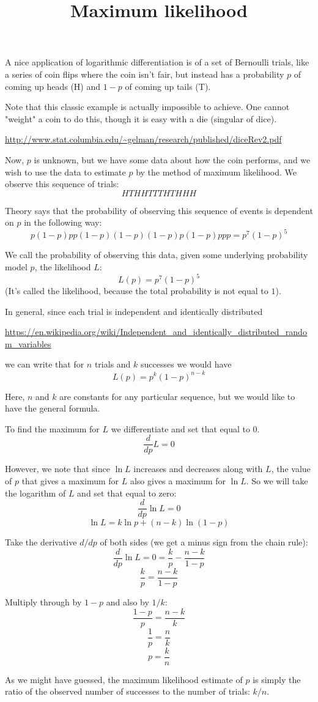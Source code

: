 \documentclass[11pt, oneside]{article}
\title{Maximum likelihood}
\date{}
\begin{document}
\maketitle
\Large
    
A nice application of logarithmic differentiation is of a set of Bernoulli trials, like a series of coin flips where the coin isn't fair, but instead has a probability $p$ of coming up heads (H) and $1-p$ of coming up tails (T).

Note that this classic example is actually impossible to achieve.  One cannot "weight" a coin to do this, though it is easy with a die (singular of dice).

\url{http://www.stat.columbia.edu/~gelman/research/published/diceRev2.pdf}

Now, $p$ is unknown, but we have some data about how the coin performs, and we wish to use the data to estimate $p$ by the method of maximum likelihood.  We observe this sequence of trials:
\[  HTHHTTTHTHHH  \]

Theory says that the probability of observing this sequence of events is dependent on $p$ in the following way:
\[  p(1-p)pp(1-p)(1-p)(1-p)p(1-p)ppp = p^7(1-p)^5  \]

We call the probability of observing this data, given some underlying probability model $p$, the likelihood $L$:
\[  L(p) = p^7(1-p)^5  \]
(It's called the likelihood, because the total probability is not equal to $1$).

In general, since each trial is independent and identically distributed

\url{https://en.wikipedia.org/wiki/Independent_and_identically_distributed_random_variables}

we can write that for $n$ trials and $k$ successes we would have
\[  L(p) = p^k(1-p)^{n-k}  \]

Here, $n$ and $k$ are constants for any particular sequence, but we would like to have the general formula.
 
To find the maximum for $L$ we differentiate and set that equal to 0.
\[  \frac{d}{dp} L = 0  \]

However, we note that since $\ln L$ increases and decreases along with $L$, the value of $p$ that gives a maximum for $L$ also gives a maximum for $\ln L$.  So we will take the logarithm of $L$ and set that equal to zero:
\[  \frac{d}{dp} \ln L = 0  \]
\[  \ln L = k \ln p + (n-k) \ln(1-p)  \]

Take the derivative $d/dp$ of both sides (we get a minus sign from the chain rule):
\[  \frac{d}{dp} \ln L = 0 = \frac{k}{p} - \frac{n-k}{1-p}  \]
\[   \frac{k}{p} = \frac{n-k}{1-p}  \]

Multiply through by $1-p$ and also by $1/k$:
\[  \frac{1-p}{p} = \frac{n-k}{k}  \]
\[   \frac{1}{p} = \frac{n}{k}  \]
\[    p = \frac{k}{n}  \]

As we might have guessed, the maximum likelihood estimate of $p$ is simply the ratio of the observed number of successes to the number of trials:  $k/n$.
\end{document}
